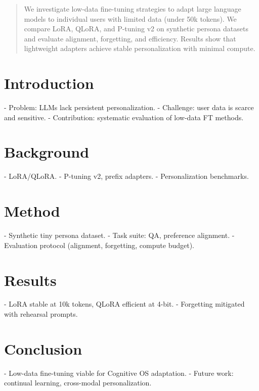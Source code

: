 \documentclass{article}
\author{
	Gustave Vernay \\
	Avisia / Aivancity / École Polytechnique (candidate PhD) \\
		exttt{gustave.vernay@example.com} \\
}
\begin{document}
\maketitle

\begin{abstract}
We investigate low-data fine-tuning strategies to adapt large language 
models to individual users with limited data (under 50k tokens). We compare 
LoRA, QLoRA, and P-tuning v2 on synthetic persona datasets and evaluate 
alignment, forgetting, and efficiency. Results show that lightweight adapters 
achieve stable personalization with minimal compute.
\end{abstract}

\section{Introduction}
- Problem: LLMs lack persistent personalization.  
- Challenge: user data is scarce and sensitive.  
- Contribution: systematic evaluation of low-data FT methods.  

\section{Background}
- LoRA/QLoRA.  
- P-tuning v2, prefix adapters.  
- Personalization benchmarks.  

\section{Method}
- Synthetic tiny persona dataset.  
- Task suite: QA, preference alignment.  
- Evaluation protocol (alignment, forgetting, compute budget).  

\section{Results}
- LoRA stable at 10k tokens, QLoRA efficient at 4-bit.  
- Forgetting mitigated with rehearsal prompts.  

\section{Conclusion}
- Low-data fine-tuning viable for Cognitive OS adaptation.  
- Future work: continual learning, cross-modal personalization.  



\end{document}
